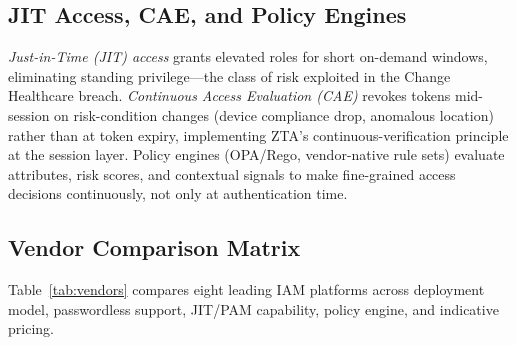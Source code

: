 \documentclass[sigconf,nonacm]{acmart}
\begin{document}
\subsection{JIT Access, CAE, and Policy Engines}

\emph{Just-in-Time (JIT) access} grants elevated roles for short
on-demand windows, eliminating standing privilege---the class of risk
exploited in the Change Healthcare breach.  \emph{Continuous Access
Evaluation (CAE)} revokes tokens mid-session on risk-condition changes
(device compliance drop, anomalous location) rather than at token
expiry, implementing ZTA's continuous-verification principle at the
session layer.  Policy engines (OPA/Rego, vendor-native rule sets)
evaluate attributes, risk scores, and contextual signals to make
fine-grained access decisions continuously, not only at authentication
time.

\subsection{Vendor Comparison Matrix}

Table~\ref{tab:vendors} compares eight leading IAM platforms across
deployment model, passwordless support, JIT/PAM capability, policy
engine, and indicative pricing.
\end{document}
